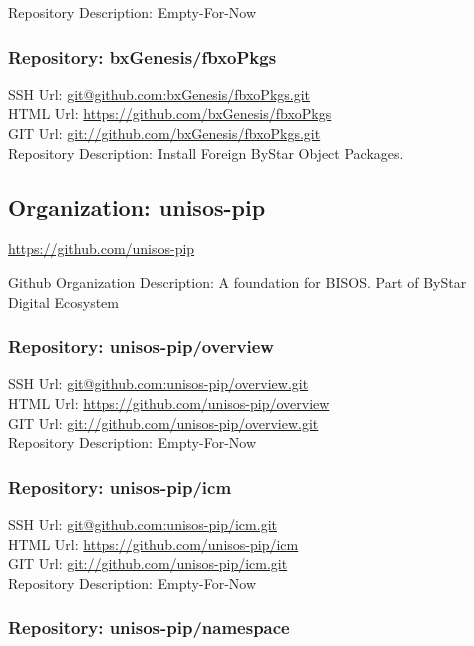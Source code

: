 Repository Description: Empty-For-Now

\subsubsection{Repository: bxGenesis/fbxoPkgs}

SSH Url:  \url{git@github.com:bxGenesis/fbxoPkgs.git}\\
HTML Url: \url{https://github.com/bxGenesis/fbxoPkgs}\\
GIT Url:  \url{git://github.com/bxGenesis/fbxoPkgs.git}\\


Repository Description: Install Foreign ByStar Object Packages.

\subsection{Organization: unisos-pip}

\url{https://github.com/unisos-pip}

Github Organization Description: A foundation for BISOS. Part of ByStar Digital Ecosystem

\subsubsection{Repository: unisos-pip/overview}

SSH Url:  \url{git@github.com:unisos-pip/overview.git}\\
HTML Url: \url{https://github.com/unisos-pip/overview}\\
GIT Url:  \url{git://github.com/unisos-pip/overview.git}\\


Repository Description: Empty-For-Now

\subsubsection{Repository: unisos-pip/icm}

SSH Url:  \url{git@github.com:unisos-pip/icm.git}\\
HTML Url: \url{https://github.com/unisos-pip/icm}\\
GIT Url:  \url{git://github.com/unisos-pip/icm.git}\\


Repository Description: Empty-For-Now

\subsubsection{Repository: unisos-pip/namespace}

